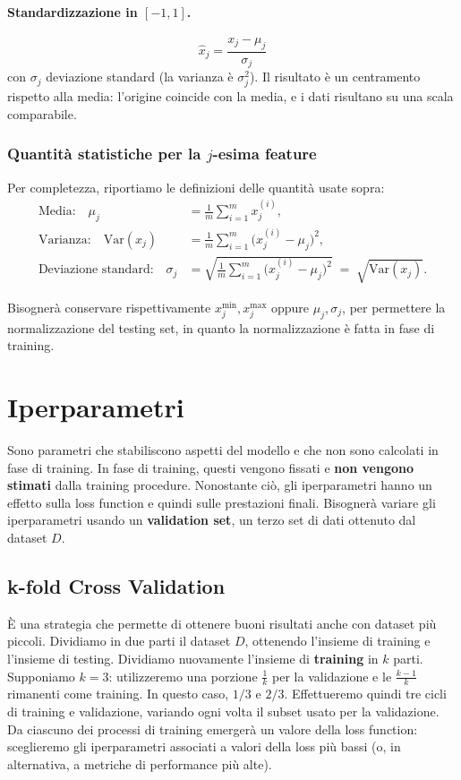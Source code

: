 \paragraph{Standardizzazione in $[-1,1]$.}
\[
  \hat{x}_j = \frac{x_j - \mu_j}{\sigma_j}
\]
con $\sigma_j$ deviazione standard (la varianza \`e $\sigma_j^2$). Il risultato \`e un centramento rispetto alla media: l'origine coincide con la media, e i dati risultano su una scala comparabile.

\subsubsection*{Quantit\`a statistiche per la $j$-esima feature}

Per completezza, riportiamo le definizioni delle quantit\`a usate sopra:
\begin{align*}
  \text{Media:}\quad
  \mu_j &= \frac{1}{m}\sum_{i=1}^m x_j^{(i)},\\[4pt]
  \text{Varianza:}\quad
  \mathrm{Var}(x_j) &= \frac{1}{m}\sum_{i=1}^m \bigl(x_j^{(i)}-\mu_j\bigr)^2,\\[4pt]
  \text{Deviazione standard:}\quad
  \sigma_j &= \sqrt{\frac{1}{m}\sum_{i=1}^m \bigl(x_j^{(i)}-\mu_j\bigr)^2}
           \;=\; \sqrt{\mathrm{Var}(x_j)}.
\end{align*}

Bisogner\`a conservare rispettivamente $x_j^{\min }, x_j^{\max }$ oppure $\mu_j, \sigma_j$, per permettere la normalizzazione del testing set, in quanto la normalizzazione \`e fatta in fase di training.

\section{Iperparametri}

Sono parametri che stabiliscono aspetti del modello e che non sono calcolati in fase di training. In fase di training, questi vengono fissati e \textbf{non vengono stimati} dalla training procedure. Nonostante ci\`o, gli iperparametri hanno un effetto sulla loss function e quindi sulle prestazioni finali. Bisogner\`a variare gli iperparametri usando un \textbf{validation set}, un terzo set di dati ottenuto dal dataset $D$.

\subsection{k-fold Cross Validation}

\`E una strategia che permette di ottenere buoni risultati anche con dataset pi\`u piccoli. Dividiamo in due parti il dataset $D$, ottenendo l'insieme di training e l'insieme di testing. Dividiamo nuovamente l'insieme di \textbf{training} in $k$ parti. Supponiamo $k=3$: utilizzeremo una porzione $\frac{1}{k}$ per la validazione e le $\frac{k-1}{k}$ rimanenti come training. In questo caso, $1/3$ e $2/3$. Effettueremo quindi tre cicli di training e validazione, variando ogni volta il subset usato per la validazione. Da ciascuno dei processi di training emerger\`a un valore della loss function: sceglieremo gli iperparametri associati a valori della loss pi\`u bassi (o, in alternativa, a metriche di performance pi\`u alte).

